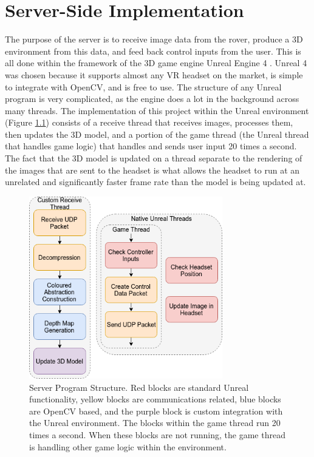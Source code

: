 \chapter{Server-Side Implementation}
\label{chapter:server}

The purpose of the server is to receive image data from the rover, produce a 3D environment from this data, and feed back control inputs from the user. This is all done within the framework of the 3D game engine Unreal Engine 4 \cite{unreal}. Unreal 4 was chosen because it supports almost any VR headset on the market, is simple to integrate with OpenCV, and is free to use. The structure of any Unreal program is very complicated, as the engine does a lot in the background across many threads. The implementation of this project within the Unreal environment (Figure \ref{fig:unreal}) consists of a receive thread that receives images, processes them, then updates the 3D model, and a portion of the game thread (the Unreal thread that handles game logic) that handles and sends user input 20 times a second. The fact that the 3D model is updated on a thread separate to the rendering of the images that are sent to the headset is what allows the headset to run at an unrelated and significantly faster frame rate than the model is being updated at.

\begin{figure}[H]
    \begin{center}
      \includegraphics[width=0.75\textwidth]{Figures/Unreal.png}
      \caption[Server Program Structure]{Server Program Structure. Red blocks are standard Unreal functionality, yellow blocks are communications related, blue blocks are OpenCV based, and the purple block is custom integration with the Unreal environment. The blocks within the game thread run 20 times a second. When these blocks are not running, the game thread is handling other game logic within the environment.}
      \label{fig:unreal}
    \end{center}
\end{figure}

